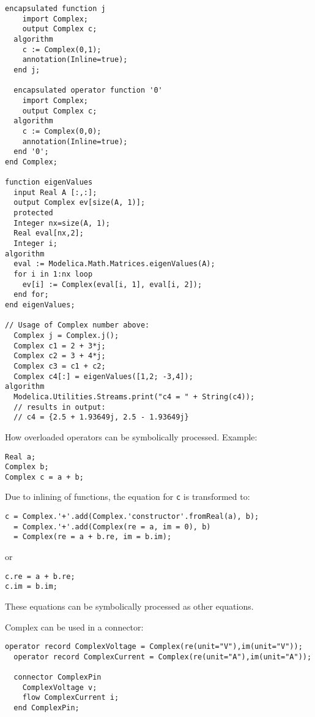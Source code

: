 \begin{example}
\begin{lstlisting}[language=modelica,escapechar=!]
  encapsulated function j
    import Complex;
    output Complex c;
  algorithm
    c := Complex(0,1);
    annotation(Inline=true);
  end j;

  encapsulated operator function '0'
    import Complex;
    output Complex c;
  algorithm
    c := Complex(0,0);
    annotation(Inline=true);
  end '0';
end Complex;

function eigenValues
  input Real A [:,:];
  output Complex ev[size(A, 1)];
  protected
  Integer nx=size(A, 1);
  Real eval[nx,2];
  Integer i;
algorithm
  eval := Modelica.Math.Matrices.eigenValues(A);
  for i in 1:nx loop
    ev[i] := Complex(eval[i, 1], eval[i, 2]);
  end for;
end eigenValues;

// Usage of Complex number above:
  Complex j = Complex.j();
  Complex c1 = 2 + 3*j;
  Complex c2 = 3 + 4*j;
  Complex c3 = c1 + c2;
  Complex c4[:] = eigenValues([1,2; -3,4]);
algorithm
  Modelica.Utilities.Streams.print("c4 = " + String(c4));
  // results in output:
  // c4 = {2.5 + 1.93649j, 2.5 - 1.93649j}
\end{lstlisting}

How overloaded operators can be symbolically processed. Example:
\begin{lstlisting}[language=modelica]
Real a;
Complex b;
Complex c = a + b;
\end{lstlisting}
Due to inlining of functions, the equation for \lstinline!c! is
transformed to:
\begin{lstlisting}[language=modelica]
c = Complex.'+'.add(Complex.'constructor'.fromReal(a), b);
  = Complex.'+'.add(Complex(re = a, im = 0), b)
  = Complex(re = a + b.re, im = b.im);
\end{lstlisting}
or
\begin{lstlisting}[language=modelica]
c.re = a + b.re;
c.im = b.im;
\end{lstlisting}
These equations can be symbolically processed as other equations.

Complex can be used in a connector:
\begin{lstlisting}[language=modelica]
  operator record ComplexVoltage = Complex(re(unit="V"),im(unit="V"));
  operator record ComplexCurrent = Complex(re(unit="A"),im(unit="A"));

  connector ComplexPin
    ComplexVoltage v;
    flow ComplexCurrent i;
  end ComplexPin;


\end{lstlisting}
\end{example}
